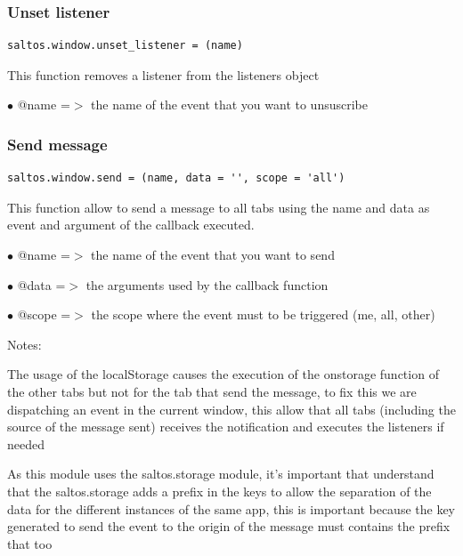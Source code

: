 \documentclass[a4paper]{article}
\begin{document}
\hypertarget{toc311}{}
\subsubsection{Unset listener}

\begin{lstlisting}
saltos.window.unset_listener = (name)
\end{lstlisting}

This function removes a listener from the listeners object

\begin{compactitem}
\item[\color{myblue}$\bullet$] @name =$>$ the name of the event that you want to unsuscribe
\end{compactitem}

\hypertarget{toc312}{}
\subsubsection{Send message}

\begin{lstlisting}
saltos.window.send = (name, data = '', scope = 'all')
\end{lstlisting}

This function allow to send a message to all tabs using the name and data
as event and argument of the callback executed.

\begin{compactitem}
\item[\color{myblue}$\bullet$] @name  =$>$ the name of the event that you want to send
\item[\color{myblue}$\bullet$] @data  =$>$ the arguments used by the callback function
\item[\color{myblue}$\bullet$] @scope =$>$ the scope where the event must to be triggered (me, all, other)
\end{compactitem}

Notes:

The usage of the localStorage causes the execution of the onstorage function
of the other tabs but not for the tab that send the message, to fix this we
are dispatching an event in the current window, this allow that all tabs
(including the source of the message sent) receives the notification and
executes the listeners if needed

As this module uses the saltos.storage module, it's important that understand
that the saltos.storage adds a prefix in the keys to allow the separation of
the data for the different instances of the same app, this is important because
the key generated to send the event to the origin of the message must contains
the prefix that too
\end{document}
